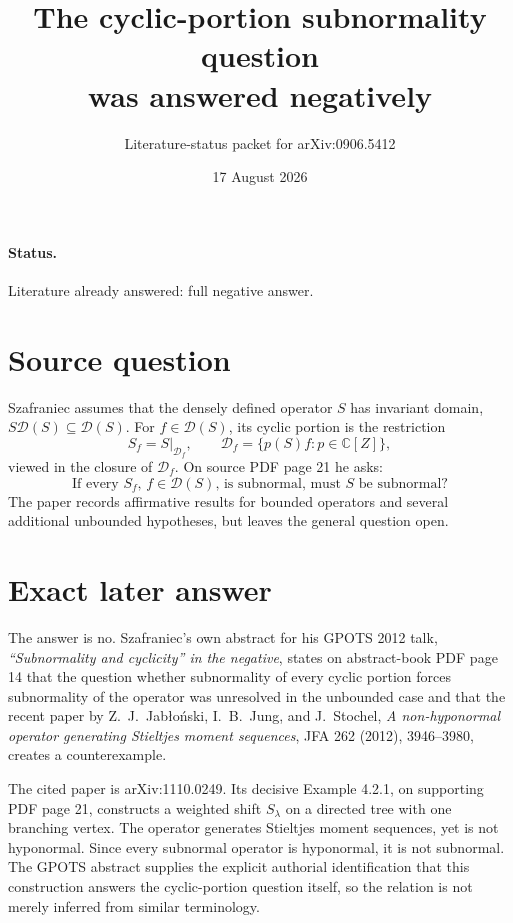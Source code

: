 \documentclass[11pt]{article}
\title{The cyclic-portion subnormality question\\was answered negatively}
\author{Literature-status packet for arXiv:0906.5412}
\date{17 August 2026}
\begin{document}
\maketitle

\paragraph{Status.}
Literature already answered: full negative answer.

\section*{Source question}

Szafraniec assumes that the densely defined operator \(S\) has invariant
domain, \(S\mathcal D(S)\subseteq\mathcal D(S)\).  For
\(f\in\mathcal D(S)\), its cyclic portion is the restriction
\[
 S_f=S\big|_{\mathcal D_f},\qquad
 \mathcal D_f=\{p(S)f:p\in\mathbb C[Z]\},
\]
viewed in the closure of \(\mathcal D_f\).  On source PDF page 21 he asks:
\[
 \boxed{\text{If every \(S_f\), \(f\in\mathcal D(S)\), is subnormal,
 must \(S\) be subnormal?}}
\]
The paper records affirmative results for bounded operators and several
additional unbounded hypotheses, but leaves the general question open.

\section*{Exact later answer}

The answer is no.  Szafraniec's own abstract for his GPOTS 2012 talk,
\emph{“Subnormality and cyclicity” in the negative}, states on abstract-book
PDF page 14 that the question whether subnormality of every cyclic portion
forces subnormality of the operator was unresolved in the unbounded case and
that the recent paper by Z.\ J.\ Jab{\l}o{\'n}ski, I.\ B.\ Jung, and
J.\ Stochel, \emph{A non-hyponormal operator generating Stieltjes moment
sequences}, JFA 262 (2012), 3946--3980, creates a counterexample.

The cited paper is arXiv:1110.0249.  Its decisive Example 4.2.1, on
supporting PDF page 21, constructs a weighted shift \(S_\lambda\) on a
directed tree with one branching vertex.  The operator generates Stieltjes
moment sequences, yet is not hyponormal.  Since every subnormal operator is
hyponormal, it is not subnormal.  The GPOTS abstract supplies the explicit
authorial identification that this construction answers the cyclic-portion
question itself, so the relation is not merely inferred from similar
terminology.
\end{document}
